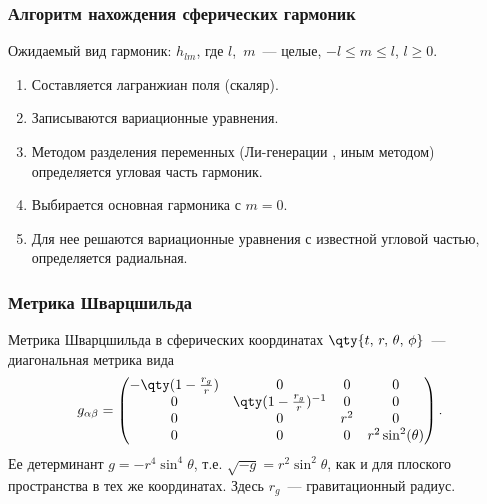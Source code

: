 \documentclass[compress, 9pt]{beamer}
\begin{document}
    \begin{frame}\frametitle{Алгоритм нахождения сферических гармоник}

        Ожидаемый вид гармоник: $h_{lm}$, где $l$,~$m$~--- целые, $-l \le m \le l$, $l \ge 0$.

        \begin{enumerate}\justifying
            \item Составляется лагранжиан поля (скаляр).
            \item Записываются вариационные уравнения.
            \item Методом разделения переменных (Ли-генерации \cite{burlankov_space_dynamics,BurVas2019}, иным методом) определяется угловая часть гармоник.
            \item Выбирается основная гармоника с $m = 0$.
            \item Для нее решаются вариационные уравнения с известной угловой частью, определяется радиальная.
        \end{enumerate}

    \end{frame}

    \begin{frame}\frametitle{Метрика Шварцшильда}

        Метрика Шварцшильда в сферических координатах $\qty{t,\,r,\,\theta,\,\phi}$~--- диагональная метрика вида
        \begin{equation*}
            g_{\alpha\beta} = \begin{pmatrix}
                -\qty(1 - \frac{r_g}{r}) & 0 & 0 & 0 \\
                0 & \qty(1 - \frac{r_g}{r})^{-1} & 0 & 0 \\
                0 & 0 & r^2 & 0 \\
                0 & 0 & 0 & r^2 \sin^2(\theta)
            \end{pmatrix} .
        \end{equation*}
        Ее детерминант $g = -r^4 \sin^4\theta$, т.е. $\sqrt{-g} = r^2 \sin^2\theta$, как и для плоского пространства в тех же координатах. Здесь $r_g$~--- гравитационный радиус.

    \end{frame}
\end{document}
